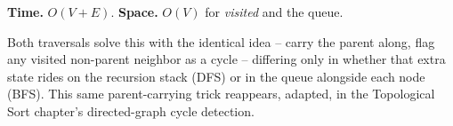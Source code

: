 \begin{complexitybox}
\textbf{Time.} $O(V+E)$.
\textbf{Space.} $O(V)$ for \textit{visited} and the queue.
\end{complexitybox}

\begin{takeawaybox}
Both traversals solve this with the identical idea -- carry the parent
along, flag any visited non-parent neighbor as a cycle -- differing
only in whether that extra state rides on the recursion stack (DFS) or
in the queue alongside each node (BFS). This same parent-carrying
trick reappears, adapted, in the Topological Sort chapter's directed-graph
cycle detection.
\end{takeawaybox}
